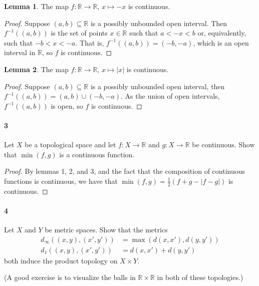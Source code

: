 \documentclass[12pt]{article}
\newlength{\myparskip}
\newenvironment{fullbox}{\begin{lrbox}{\savefullbox}\begin{minipage}{\dimexpr\textwidth-2\fboxsep\relax}\setlength{\parskip}{\myparskip}}{\end{minipage}\end{lrbox}\framebox[\textwidth]{\usebox{\savefullbox}}}
\newenvironment{pbox}[1][]{\begin{fullbox}\ifx#1\empty\else\paragraph{#1}\fi}{\end{fullbox}}
\theoremstyle{definition}
\newtheorem{lemma}{Lemma}
\newcommand{\R}{\mathbb{R}}
\newcommand{\<}{\langle}
\renewcommand{\>}{\rangle}
\begin{document}
\begin{lemma}
    The map $f : \R \to \R$, $x \mapsto -x$ is continuous.
\end{lemma}

\begin{proof}
    Suppose $(a, b) \subseteq \R$ is a possibly unbounded open interval. Then $f^{-1}((a, b))$ is the set of points $x \in \R$ such that $a < -x < b$ or, equivalently, such that $-b < x < -a$. That is, $f^{-1}((a, b)) = (-b, -a)$, which is an open interval in $\R$, so $f$ is continuous.

\end{proof}

\begin{lemma}
    The map $f : \R \to \R$, $x \mapsto |x|$ is continuous.
\end{lemma}

\begin{proof}
    Suppose $(a, b) \subseteq \R$ is a possibly unbounded open interval, then $f^{-1}((a, b)) = (a, b) \cup (-b, -a)$. As the union of open intervals, $f^{-1}((a, b))$ is open, so $f$ is continuous.

\end{proof}

\begin{pbox}[3]
    Let $X$ be a topological space and let $f:X \to \mathbb R$ and
      $g:X \to \mathbb R$ be continuous.  Show that $\min(f,g)$ is a continuous
      function.
\end{pbox}

\begin{proof}
    By lemmas 1, 2, and 3, and the fact that the composition of continuous functions is continuous, we have that $\min(f, g) = \tfrac{1}{2}(f + g - |f - g|)$ is continuous.

\end{proof}



\newpage
\begin{pbox}[4]
    Let $X$ and $Y$ be metric spaces.  Show that the metrics
      \begin{align*}
        d_\infty((x,y),(x',y')) &= \max(d(x,x'),d(y,y')) \\
        d_1((x,y),(x',y')) &= d(x,x')+d(y,y')
      \end{align*}
      both induce the product topology on $X \times Y$.
    
      \medskip
      \noindent(A good exercise is to visualize the balls in
      $\mathbb R \times \mathbb R$ in both of these topologies.)
\end{pbox}
\end{document}
